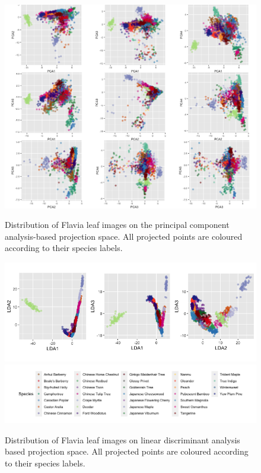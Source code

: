 \documentclass{article}
\begin{document}
\begin{figure}
\centering
\includegraphics[width=0.9\columnwidth]{img/flaviapca.png}
\caption{\label{pcaflaviasp}Distribution of Flavia leaf images on the
principal component analysis-based projection space. All
projected points are coloured according to their species labels.}
\includegraphics[width=0.8\columnwidth]{img/flavialdaspecies.png}
\includegraphics[width=0.8\columnwidth]{img/flavialegend.png}
\caption{\label{ldaflaviasp}Distribution of Flavia leaf images on linear discriminant analysis based projection space. All
projected points are coloured according to their species labels.}
\end{figure}


\newpage
\end{document}
